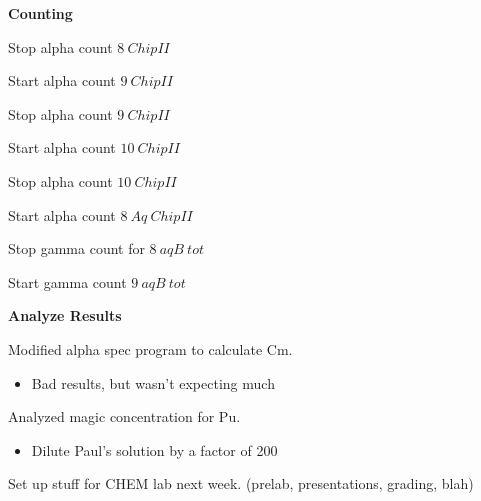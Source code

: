 \documentclass[idxtotoc,hyperref,openany,oneside]{labbook} %
\newcommand{\cmark}{\ding{51}}%
\newcommand{\done}{\rlap{$\square$}{\raisebox{2pt}{\large\hspace{1pt}\cmark}}%
  \hspace{-2.5pt}}
\begin{document}



\textbf{Counting}
\begin{todolist}
\item[\done]{Stop alpha count $\boxed{8\ ChipII}$}
\item[\done]{Start alpha count $\boxed{9\ ChipII}$}
\item[\done]{Stop alpha count $\boxed{9\ ChipII}$}
\item[\done]{Start alpha count $\boxed{10\ ChipII}$}
\item[\done]{Stop alpha count $\boxed{10\ ChipII}$}
\item[\done]{Start alpha count $\boxed{8\ Aq\ ChipII}$}
  
\item[\done]{Stop gamma count for $\boxed{8\ aqB\ tot}$}
\item[\done]{Start gamma count $\boxed{9\ aqB\ tot}$}
\end{todolist}

\textbf{Analyze Results}

\begin{todolist}
\item[\done]{Modified alpha spec program to calculate Cm.}
  \begin{itemize}
  \item{Bad results, but wasn't expecting much}
  \end{itemize}
\item[\done]{Analyzed magic concentration for Pu.}
  \begin{itemize}
  \item{Dilute Paul's solution by a factor of 200}
  \end{itemize}
\end{todolist}


Set up stuff for CHEM lab next week. (prelab, presentations, grading, blah)



\end{document}
